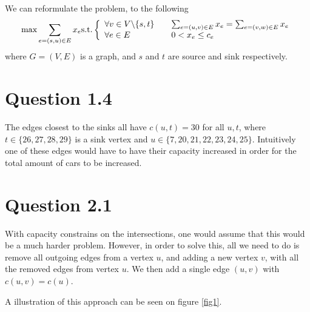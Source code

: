 \documentclass[10pt]{article}
\begin{document}
We can reformulate the problem, to the following
\begin{equation}
	\text{max} \sum_{e=(s,u) \in E} x_e \text{s.t.} \left\{
	\begin{array}{l l}
		\forall v \in V\backslash\{s,t\} & \quad \sum_{e=(u,v) \in E} x_e = \sum_{e=(v,w) \in E} x_e \\
		\forall e \in E & \quad 0 < x_e \leq c_e
	\end{array} \right. \label{LP}
\end{equation}
where $G = (V, E)$ is a graph, and $s$ and $t$ are source and sink respectively.



\section*{Question 1.4} %
\label{sec:question_1_4}
The edges closest to the sinks all have $c(u,t) = 30$ for all $u,t$, where $t \in \{26, 27, 28, 29\}$ is a sink vertex and $u \in \{7, 20, 21, 22, 23, 24, 25\}$. 
Intuitively one of these edges would have to have their capacity increased in order for the total amount of cars to be increased.


\section*{Question 2.1} %
\label{sec:question_2_1}
With capacity constrains on the intersections, one would assume that this would be a much harder problem.
However, in order to solve this, all we need to do is remove all outgoing edges from a vertex $u$, and adding a new vertex $v$, with all the removed edges from vertex $u$.
We then add a single edge $(u,v)$ with $c(u, v) = c(u)$.

A illustration of this approach can be seen on figure \ref{fig1}.
\end{document}
